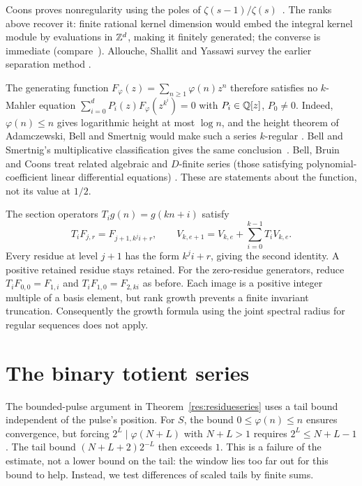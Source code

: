 \documentclass[11pt]{article}
\begin{document}
Coons proves nonregularity using the poles of
$\zeta(s-1)/\zeta(s)$~\cite[Cor.~3.1, Thm.~3.2]{coons}.
The ranks above recover it: finite rational kernel dimension would
embed the integral kernel module by evaluations in $\mathbb{Z}^d$, making
it finitely generated; the converse is immediate
(compare~\cite[App.~A]{coons-jsr}).
Allouche, Shallit and Yassawi survey the earlier separation method
\cite[Thm.~3, Ex.~4, Rem.~7]{allouche-shallit-yassawi}.

The generating function $F_\varphi(z)=\sum_{n\ge1}\varphi(n)z^n$
therefore satisfies no $k$-Mahler equation
$\sum_{i=0}^dP_i(z)F_\varphi(z^{k^i})=0$ with $P_i\in\mathbb{Q}[z]$,
$P_0\ne0$. Indeed, $\varphi(n)\le n$ gives logarithmic height at most
$\log n$, and the height theorem of Adamczewski, Bell and Smertnig
would make such a series $k$-regular
\cite[Thm.~1.2(b)]{adamczewski-bell-smertnig2023}.
Bell and Smertnig's multiplicative classification gives the same
conclusion~\cite[Thm.~1.3]{bell-smertnig2026}.
Bell, Bruin and Coons treat related algebraic and $D$-finite series
(those satisfying polynomial-coefficient linear differential equations)
\cite[Thms.~1.5--1.6]{bell-bruin-coons}.
These are statements about the function, not its value at $1/2$.

The section operators $T_i g(n)=g(kn+i)$ satisfy
\[
 T_iF_{j,r}=F_{j+1,k^ji+r},\qquad
 V_{k,e+1}=V_{k,e}+\sum_{i=0}^{k-1}T_iV_{k,e}.
\]
Every residue at level $j+1$ has the form $k^ji+r$, giving the second
identity. A positive retained residue stays retained. For the zero-residue
generators, reduce $T_iF_{0,0}=F_{1,i}$ and $T_iF_{1,0}=F_{2,ki}$ as
before. Each image is a positive integer multiple of a basis element,
but rank growth prevents a finite invariant truncation. Consequently
the growth formula using the joint spectral radius for regular sequences
\cite[Thm.~1, Prop.~4, Cor.~7]{coons-jsr} does not apply.

\section{The binary totient series}\label{sec:carry-rank}
The bounded-pulse argument in Theorem~\ref{res:residueseries} uses a
tail bound independent of the pulse's position. For $S$, the bound
$0\le\varphi(n)\le n$ ensures convergence, but forcing
$2^L\mid\varphi(N+L)$ with $N+L>1$ requires $2^L\le N+L-1$.
The tail bound $(N+L+2)2^{-L}$ then exceeds $1$.
This is a failure of the estimate, not a lower bound on the tail:
the window lies too far out for this bound to help.
Instead, we test differences of scaled tails by finite sums.
\end{document}
